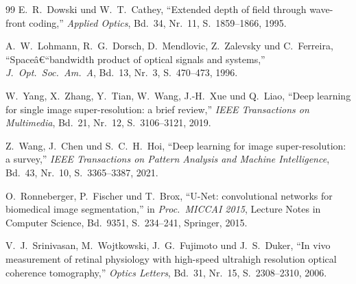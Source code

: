 ﻿\documentclass[12pt,a4paper]{article}
\theoremstyle{definition}
\begin{document}
\begin{thebibliography}{99}
		E.~R.~Dowski und W.~T.~Cathey,
		``Extended depth of field through wave-front coding,''
		\textit{Applied Optics}, Bd.~34, Nr.~11, S.~1859--1866, 1995.

		A.~W.~Lohmann, R.~G.~Dorsch, D.~Mendlovic, Z.~Zalevsky und C.~Ferreira,
		``Spaceâ€“bandwidth product of optical signals and systems,''
		\textit{J.~Opt.~Soc.~Am.~A}, Bd.~13, Nr.~3, S.~470--473, 1996.

		W.~Yang, X.~Zhang, Y.~Tian, W.~Wang, J.-H.~Xue und Q.~Liao,
		``Deep learning for single image super-resolution: a brief review,''
		\textit{IEEE Transactions on Multimedia}, Bd.~21, Nr.~12,
		S.~3106--3121, 2019.

		Z.~Wang, J.~Chen und S.~C.~H.~Hoi,
		``Deep learning for image super-resolution: a survey,''
		\textit{IEEE Transactions on Pattern Analysis and Machine Intelligence},
		Bd.~43, Nr.~10, S.~3365--3387, 2021.

		O.~Ronneberger, P.~Fischer und T.~Brox,
		``U-Net: convolutional networks for biomedical image segmentation,''
		in \textit{Proc.\ MICCAI 2015}, Lecture Notes in Computer Science,
		Bd.~9351, S.~234--241, Springer, 2015.

		V.~J.~Srinivasan, M.~Wojtkowski, J.~G.~Fujimoto und J.~S.~Duker,
		``In vivo measurement of retinal physiology with high-speed ultrahigh
		resolution optical coherence tomography,''
		\textit{Optics Letters}, Bd.~31, Nr.~15, S.~2308--2310, 2006.

	\end{thebibliography}
	
\end{document}
